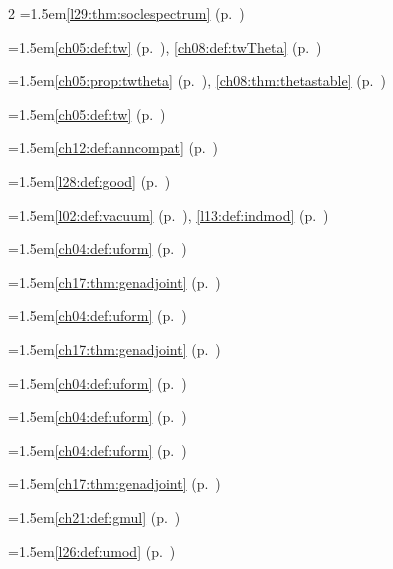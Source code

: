 \begin{multicols}{2}
\hangindent=1.5em\quad \ref{l29:thm:soclespectrum} (p.~\pageref{l29:thm:soclespectrum})\par
\hangindent=1.5em\quad \ref{ch05:def:tw} (p.~\pageref{ch05:def:tw}), \ref{ch08:def:twTheta} (p.~\pageref{ch08:def:twTheta})\par
\hangindent=1.5em\quad \ref{ch05:prop:twtheta} (p.~\pageref{ch05:prop:twtheta}), \ref{ch08:thm:thetastable} (p.~\pageref{ch08:thm:thetastable})\par
\hangindent=1.5em\quad \ref{ch05:def:tw} (p.~\pageref{ch05:def:tw})\par
\hangindent=1.5em\quad \ref{ch12:def:anncompat} (p.~\pageref{ch12:def:anncompat})\par
\par{}\par\nopagebreak\smallskip
\hangindent=1.5em\quad \ref{l28:def:good} (p.~\pageref{l28:def:good})\par
\hangindent=1.5em\quad \ref{l02:def:vacuum} (p.~\pageref{l02:def:vacuum}), \ref{l13:def:indmod} (p.~\pageref{l13:def:indmod})\par
\hangindent=1.5em\quad \ref{ch04:def:uform} (p.~\pageref{ch04:def:uform})\par
\hangindent=1.5em\quad \ref{ch17:thm:genadjoint} (p.~\pageref{ch17:thm:genadjoint})\par
\hangindent=1.5em\quad \ref{ch04:def:uform} (p.~\pageref{ch04:def:uform})\par
\hangindent=1.5em\quad \ref{ch17:thm:genadjoint} (p.~\pageref{ch17:thm:genadjoint})\par
\hangindent=1.5em\quad \ref{ch04:def:uform} (p.~\pageref{ch04:def:uform})\par
\hangindent=1.5em\quad \ref{ch04:def:uform} (p.~\pageref{ch04:def:uform})\par
\hangindent=1.5em\quad \ref{ch04:def:uform} (p.~\pageref{ch04:def:uform})\par
\hangindent=1.5em\quad \ref{ch17:thm:genadjoint} (p.~\pageref{ch17:thm:genadjoint})\par
\hangindent=1.5em\quad \ref{ch21:def:gmul} (p.~\pageref{ch21:def:gmul})\par
\hangindent=1.5em\quad \ref{l26:def:umod} (p.~\pageref{l26:def:umod})\par

\end{multicols}

